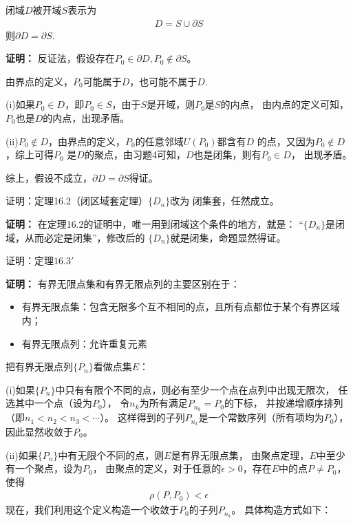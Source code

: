 \documentclass{article}
\begin{document}
\begin{zremark}
  闭域$D$被开域$S$表示为
  \begin{align*}
    D = S \cup \partial S
  \end{align*}
  则$\partial D = \partial S$.
\end{zremark}
\textbf{证明：}
反证法，假设存在$P_0 \in \partial D, P_0 \notin \partial S$。

由界点的定义，$P_0$可能属于$D$，也可能不属于$D$.

(i)如果$P_0 \in D$，即$P_0 \in S$，由于$S$是开域，则$P_0$是$S$的内点，
由内点的定义可知，$P_0$也是$D$的内点，出现矛盾。

(ii)$P_0 \notin D$，由界点的定义，$P_0$的任意邻域$U(P_0)$都含有$D$
的点，又因为$P_0 \notin D$，综上可得$P_0$
是$D$的聚点，由习题4可知，$D$也是闭集，则有$P_0 \in D$，
出现矛盾。

综上，假设不成立，$\partial D = \partial S$得证。

\begin{zremark}
  证明：定理16.2（闭区域套定理）$\{D_n\}$改为
  闭集套，任然成立。
\end{zremark}
\textbf{证明：}
在定理16.2的证明中，唯一用到闭域这个条件的地方，就是：
“$\{D_n\}$是闭域，从而必定是闭集”，修改后的
$\{D_n\}$就是闭集，命题显然得证。

\begin{zremark}
  证明：定理$16.3'$
\end{zremark}
\textbf{证明：}
有界无限点集和有界无限点列的主要区别在于：
\begin{itemize}
  \item 有界无限点集：包含无限多个互不相同的点，且所有点都位于某个有界区域内；
  \item 有界无限点列：允许重复元素
\end{itemize}
把有界无限点列$\{P_n\}$看做点集$E$：

(i)如果$\{P_n\}$中只有有限个不同的点，则必有至少一个点在点列中出现无限次，
任选其中一个点（设为$P_0$），
令${n_k}$为所有满足$P_{n_k} = P_0$的下标，
并按递增顺序排列（即$n_1 < n_2 < n_3 < \cdots$）。
这样得到的子列${P_{n_k}}$是一个常数序列（所有项均为$P_0$），
因此显然收敛于$P_0$。

(ii)如果$\{P_n\}$中有无限个不同的点，则$E$是有界无限点集，
由聚点定理，$E$中至少有一个聚点，设为$P_0$，
由聚点的定义，对于任意的$\epsilon > 0$，存在$E$中的点$P \neq P_0$，
使得
\begin{align*}
  \rho(P, P_0) < \epsilon
\end{align*}
现在，我们利用这个定义构造一个收敛于$P_0$的子列$P_{n_k}$。
具体构造方式如下：
\end{document}

